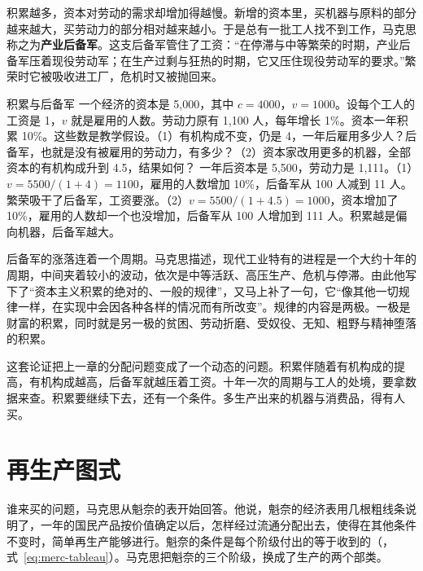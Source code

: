 积累越多，资本对劳动的需求却增加得越慢。新增的资本里，买机器与原料的部分越来越大，买劳动力的部分相对越来越小\cite{marx1887}。于是总有一批工人找不到工作，马克思称之为\textbf{产业后备军}。这支后备军管住了工资：“在停滞与中等繁荣的时期，产业后备军压着现役劳动军；在生产过剩与狂热的时期，它又压住现役劳动军的要求。”\cite{marx1887}繁荣时它被吸收进工厂，危机时又被抛回来。

\begin{example}{积累与后备军}\label{ex:marx-reserve}
一个经济的资本是 5,000，其中 $c=4000$，$v=1000$。设每个工人的工资是 1，$v$ 就是雇用的人数。劳动力原有 1,100 人，每年增长 1\%。资本一年积累 10\%。这些数是教学假设。（1）有机构成不变，仍是 4，一年后雇用多少人？后备军，也就是没有被雇用的劳动力，有多少？（2）资本家改用更多的机器，全部资本的有机构成升到 4.5，结果如何？
\solution 一年后资本是 5,500，劳动力是 1,111。（1）$v=5500/(1+4)=1100$，雇用的人数增加 10\%，后备军从 100 人减到 11 人。繁荣吸干了后备军，工资要涨。（2）$v=5500/(1+4.5)=1000$，资本增加了 10\%，雇用的人数却一个也没增加，后备军从 100 人增加到 111 人。积累越是偏向机器，后备军越大。
\end{example}

后备军的涨落连着一个周期。马克思描述，现代工业特有的进程是一个大约十年的周期，中间夹着较小的波动，依次是中等活跃、高压生产、危机与停滞\cite{marx1887}。由此他写下了“资本主义积累的绝对的、一般的规律”，又马上补了一句，它“像其他一切规律一样，在实现中会因各种各样的情况而有所改变”\cite{marx1887}。规律的内容是两极。一极是财富的积累，同时就是另一极的贫困、劳动折磨、受奴役、无知、粗野与精神堕落的积累\cite{marx1887}。

这套论证把上一章的分配问题变成了一个动态的问题。积累伴随着有机构成的提高，有机构成越高，后备军就越压着工资。十年一次的周期与工人的处境，要拿数据来查。积累要继续下去，还有一个条件。多生产出来的机器与消费品，得有人买。

\section{再生产图式}\label{sec:marx-schemes}

谁来买的问题，马克思从魁奈的表开始回答。他说，魁奈的经济表用几根粗线条说明了，一年的国民产品按价值确定以后，怎样经过流通分配出去，使得在其他条件不变时，简单再生产能够进行\cite{marx1885}。魁奈的条件是每个阶级付出的等于收到的（，式~\eqref{eq:merc-tableau}）。马克思把魁奈的三个阶级，换成了生产的两个部类。

